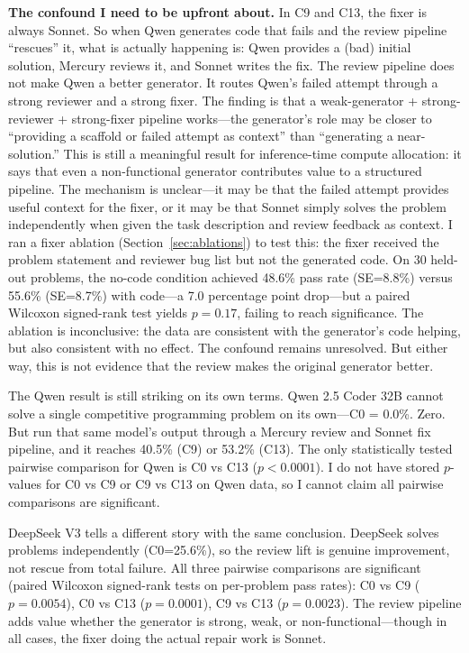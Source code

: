 \documentclass{article}
\begin{document}
\textbf{The confound I need to be upfront about.} In C9 and C13, the fixer is always Sonnet. So when Qwen generates code that fails and the review pipeline ``rescues'' it, what is actually happening is: Qwen provides a (bad) initial solution, Mercury reviews it, and Sonnet writes the fix. The review pipeline does not make Qwen a better generator. It routes Qwen's failed attempt through a strong reviewer and a strong fixer. The finding is that a weak-generator + strong-reviewer + strong-fixer pipeline works---the generator's role may be closer to ``providing a scaffold or failed attempt as context'' than ``generating a near-solution.'' This is still a meaningful result for inference-time compute allocation: it says that even a non-functional generator contributes value to a structured pipeline. The mechanism is unclear---it may be that the failed attempt provides useful context for the fixer, or it may be that Sonnet simply solves the problem independently when given the task description and review feedback as context. I ran a fixer ablation (Section~\ref{sec:ablations}) to test this: the fixer received the problem statement and reviewer bug list but not the generated code. On 30 held-out problems, the no-code condition achieved 48.6\% pass rate (SE=8.8\%) versus 55.6\% (SE=8.7\%) with code---a 7.0 percentage point drop---but a paired Wilcoxon signed-rank test yields $p=0.17$, failing to reach significance. The ablation is inconclusive: the data are consistent with the generator's code helping, but also consistent with no effect. The confound remains unresolved. But either way, this is not evidence that the review makes the original generator better.

The Qwen result is still striking on its own terms. Qwen 2.5 Coder 32B cannot solve a single competitive programming problem on its own---C0 = 0.0\%. Zero. But run that same model's output through a Mercury review and Sonnet fix pipeline, and it reaches 40.5\% (C9) or 53.2\% (C13). The only statistically tested pairwise comparison for Qwen is C0 vs C13 ($p<0.0001$). I do not have stored $p$-values for C0 vs C9 or C9 vs C13 on Qwen data, so I cannot claim all pairwise comparisons are significant.

DeepSeek V3 tells a different story with the same conclusion. DeepSeek solves problems independently (C0=25.6\%), so the review lift is genuine improvement, not rescue from total failure. All three pairwise comparisons are significant (paired Wilcoxon signed-rank tests on per-problem pass rates): C0 vs C9 ($p=0.0054$), C0 vs C13 ($p=0.0001$), C9 vs C13 ($p=0.0023$). The review pipeline adds value whether the generator is strong, weak, or non-functional---though in all cases, the fixer doing the actual repair work is Sonnet.
\end{document}
